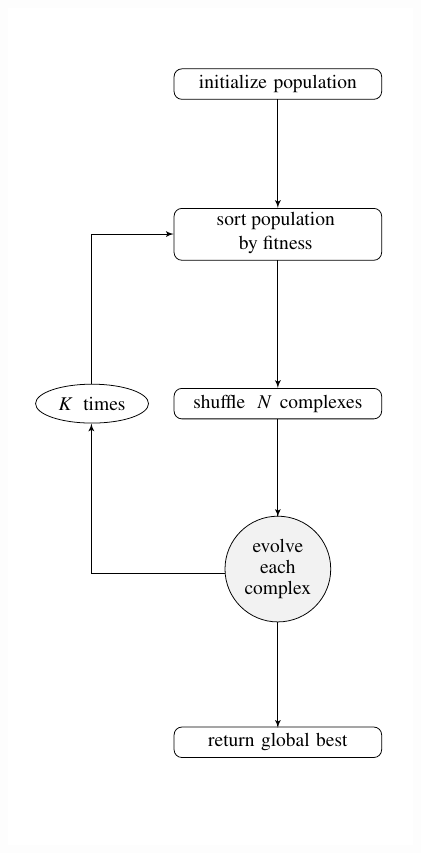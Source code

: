 \begin{frame}
\begin{columns}
\begin{column}{0.25\textwidth}
  \hspace{-15pt}\includegraphics[scale=0.45]{img/sce/flow1}
\end{column}
\end{columns}
\end{frame}

